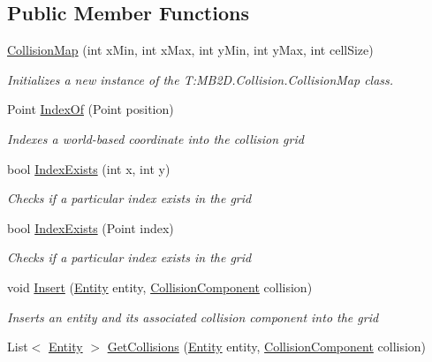 \subsection*{Public Member Functions}
\begin{DoxyCompactItemize}
\item 
\hyperlink{class_m_b2_d_1_1_collision_1_1_collision_map_a715fbf658eed15c6f54a38a9bbb0cc82}{Collision\+Map} (int x\+Min, int x\+Max, int y\+Min, int y\+Max, int cell\+Size)
\begin{DoxyCompactList}\small\item\em Initializes a new instance of the T\+:\+M\+B2\+D.\+Collision.\+Collision\+Map class. \end{DoxyCompactList}\item 
Point \hyperlink{class_m_b2_d_1_1_collision_1_1_collision_map_a738f7b15771993a037044aace6a6e09b}{Index\+Of} (Point position)
\begin{DoxyCompactList}\small\item\em Indexes a world-\/based coordinate into the collision grid \end{DoxyCompactList}\item 
bool \hyperlink{class_m_b2_d_1_1_collision_1_1_collision_map_adb3b318fb729bd02cda21a450e504465}{Index\+Exists} (int x, int y)
\begin{DoxyCompactList}\small\item\em Checks if a particular index exists in the grid \end{DoxyCompactList}\item 
bool \hyperlink{class_m_b2_d_1_1_collision_1_1_collision_map_aa90ce934e081513f78aceacab50f27da}{Index\+Exists} (Point index)
\begin{DoxyCompactList}\small\item\em Checks if a particular index exists in the grid \end{DoxyCompactList}\item 
void \hyperlink{class_m_b2_d_1_1_collision_1_1_collision_map_a7d53571c049d50d62e6132413fe712e3}{Insert} (\hyperlink{class_m_b2_d_1_1_entity_component_1_1_entity}{Entity} entity, \hyperlink{class_m_b2_d_1_1_entity_component_1_1_collision_component}{Collision\+Component} collision)
\begin{DoxyCompactList}\small\item\em Inserts an entity and its associated collision component into the grid \end{DoxyCompactList}\item 
List$<$ \hyperlink{class_m_b2_d_1_1_entity_component_1_1_entity}{Entity} $>$ \hyperlink{class_m_b2_d_1_1_collision_1_1_collision_map_acbc6d9d9bb85342cf8f07c22f6947b27}{Get\+Collisions} (\hyperlink{class_m_b2_d_1_1_entity_component_1_1_entity}{Entity} entity, \hyperlink{class_m_b2_d_1_1_entity_component_1_1_collision_component}{Collision\+Component} collision)

\end{DoxyCompactItemize}
